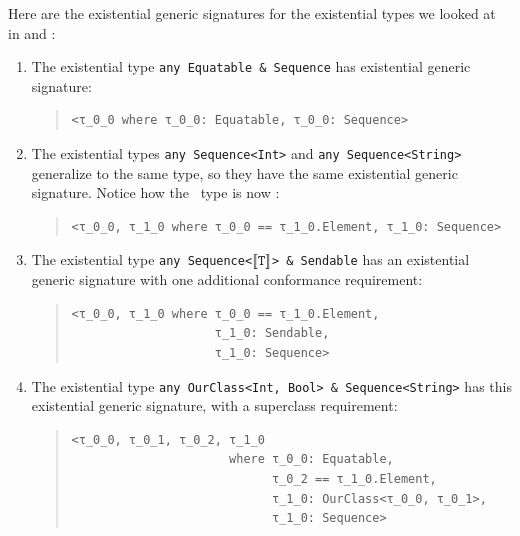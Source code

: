 \documentclass[../generics]{subfiles}
\begin{document}
\begin{example}\label{ex:existential signature}
Here are the existential generic signatures for the existential types we looked at in  and :
\begin{enumerate}
\item The existential type \texttt{any Equatable \& Sequence} has existential generic signature:
\begin{quote}
\begin{verbatim}
<τ_0_0 where τ_0_0: Equatable, τ_0_0: Sequence>
\end{verbatim}
\end{quote}
\item The existential types \texttt{any Sequence<Int>} and \texttt{any Sequence<String>} generalize to the same type, so they have the same existential generic signature. Notice how the \tSelf\ type is now \rO:
\begin{quote}
\begin{verbatim}
<τ_0_0, τ_1_0 where τ_0_0 == τ_1_0.Element, τ_1_0: Sequence>
\end{verbatim}
\end{quote}
\item The existential type \texttt{any Sequence<$[\![\texttt{T}]\!]$> \& Sendable} has an existential generic signature with one additional conformance requirement:
\begin{quote}
\begin{verbatim}
<τ_0_0, τ_1_0 where τ_0_0 == τ_1_0.Element,
                    τ_1_0: Sendable,
                    τ_1_0: Sequence>
\end{verbatim}
\end{quote}
 \item The existential type \texttt{any OurClass<Int, Bool> \& Sequence<String>} has this existential generic signature, with a superclass requirement:
\begin{quote}
\begin{verbatim}
<τ_0_0, τ_0_1, τ_0_2, τ_1_0
                      where τ_0_0: Equatable,
                            τ_0_2 == τ_1_0.Element,
                            τ_1_0: OurClass<τ_0_0, τ_0_1>,
                            τ_1_0: Sequence>
\end{verbatim}
\end{quote}
\end{enumerate}
\end{example}
\end{document}
